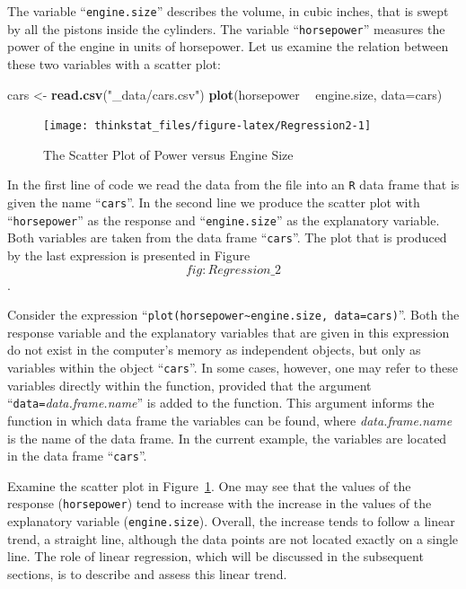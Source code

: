 \documentclass[]{krantz}
\makeatletter
\newenvironment{Shaded}{\begin{snugshade}}{\end{snugshade}}
\newcommand{\KeywordTok}[1]{\textcolor[rgb]{0.13,0.29,0.53}{\textbf{#1}}}
\newcommand{\DataTypeTok}[1]{\textcolor[rgb]{0.13,0.29,0.53}{#1}}
\newcommand{\StringTok}[1]{\textcolor[rgb]{0.31,0.60,0.02}{#1}}
\newcommand{\OperatorTok}[1]{\textcolor[rgb]{0.81,0.36,0.00}{\textbf{#1}}}
\newcommand{\NormalTok}[1]{#1}
\newenvironment{kframe}{%
\medskip{}
\setlength{\fboxsep}{.8em}
 \def\at@end@of@kframe{}%
 \ifinner\ifhmode%
  \def\at@end@of@kframe{\end{minipage}}%
  \begin{minipage}{\columnwidth}%
 \fi\fi%
 \def\FrameCommand##1{\hskip\@totalleftmargin \hskip-\fboxsep
 \colorbox{shadecolor}{##1}\hskip-\fboxsep
     \hskip-\linewidth \hskip-\@totalleftmargin \hskip\columnwidth}%
 \MakeFramed {\advance\hsize-\width
   \@totalleftmargin\z@ \linewidth\hsize
   \@setminipage}}%
 {\par\unskip\endMakeFramed%
 \at@end@of@kframe}
\renewenvironment{Shaded}{\begin{kframe}}{\end{kframe}}
\theoremstyle{definition}
\theoremstyle{definition}
\theoremstyle{definition}
\theoremstyle{remark}
\makeatother
\begin{document}
The variable ``\texttt{engine.size}'' describes the volume, in cubic
inches, that is swept by all the pistons inside the cylinders. The
variable ``\texttt{horsepower}'' measures the power of the engine in
units of horsepower. Let us examine the relation between these two
variables with a scatter plot:

\begin{Shaded}
\begin{Highlighting}[]
\NormalTok{cars <-}\StringTok{ }\KeywordTok{read.csv}\NormalTok{(}\StringTok{"_data/cars.csv"}\NormalTok{)}
\KeywordTok{plot}\NormalTok{(horsepower }\OperatorTok{~}\StringTok{ }\NormalTok{engine.size, }\DataTypeTok{data=}\NormalTok{cars)}
\end{Highlighting}
\end{Shaded}

\begin{figure}

{\centering \texttt{[image: thinkstat\_files/figure-latex/Regression2-1]} 

}

\caption{The Scatter Plot of Power versus Engine Size}\label{fig:Regression2}
\end{figure}

In the first line of code we read the data from the file into an
\texttt{R} data frame that is given the name ``\texttt{cars}''. In the
second line we produce the scatter plot with ``\texttt{horsepower}'' as
the response and ``\texttt{engine.size}'' as the explanatory variable.
Both variables are taken from the data frame ``\texttt{cars}''. The plot
that is produced by the last expression is presented in
Figure~\[fig:Regression\_2\].

Consider the expression
``\texttt{plot(horsepower\textasciitilde{}engine.size,\ data=cars)}''.
Both the response variable and the explanatory variables that are given
in this expression do not exist in the computer's memory as independent
objects, but only as variables within the object ``\texttt{cars}''. In
some cases, however, one may refer to these variables directly within
the function, provided that the argument
``\texttt{data=}\emph{data.frame.name}'' is added to the function. This
argument informs the function in which data frame the variables can be
found, where \emph{data.frame.name} is the name of the data frame. In
the current example, the variables are located in the data frame
``\texttt{cars}''.

Examine the scatter plot in Figure~\ref{fig:Regression2}. One may see
that the values of the response (\texttt{horsepower}) tend to increase
with the increase in the values of the explanatory variable
(\texttt{engine.size}). Overall, the increase tends to follow a linear
trend, a straight line, although the data points are not located exactly
on a single line. The role of linear regression, which will be discussed
in the subsequent sections, is to describe and assess this linear trend.
\end{document}
